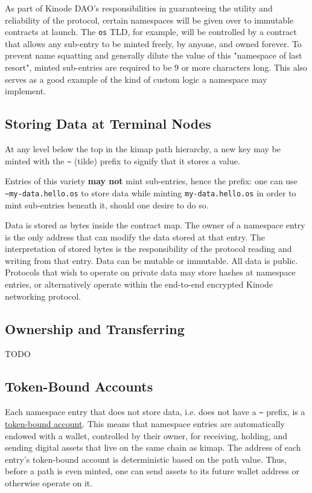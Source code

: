 \documentclass[runningheads]{llncs}
\begin{document}
As part of Kinode DAO's responsibilities in guaranteeing the utility and reliability of the protocol, certain namespaces will be given over to immutable contracts at launch.
The \verb|os| TLD, for example, will be controlled by a contract that allows any sub-entry to be minted freely, by anyone, and owned forever.
To prevent name squatting and generally dilute the value of this "namespace of last resort", minted sub-entries are required to be 9 or more characters long.
This also serves as a good example of the kind of custom logic a namespace may implement.

\subsection{Storing Data at Terminal Nodes}

At any level below the top in the kimap path hierarchy, a new key may be minted with the \verb|~| (tilde) prefix to signify that it stores a value.

Entries of this variety \textbf{may not} mint sub-entries, hence the prefix: one can use \verb|~my-data.hello.os| to store data while minting \verb|my-data.hello.os| in order to mint sub-entries beneath it, should one desire to do so.

Data is stored as bytes inside the contract map.
The owner of a namespace entry is the only address that can modify the data stored at that entry.
The interpretation of stored bytes is the responsibility of the protocol reading and writing from that entry.
Data can be mutable or immutable.
All data is public.
Protocols that wish to operate on private data may store hashes at namespace entries, or alternatively operate within the end-to-end encrypted Kinode networking protocol.

\subsection{Ownership and Transferring}

TODO

\subsection{Token-Bound Accounts}

Each namespace entry that does not store data, i.e. does not have a \verb|~| prefix, is a \href{https://eips.ethereum.org/EIPS/eip-6551}{token-bound account}.
This means that namespace entries are automatically endowed with a wallet, controlled by their owner, for receiving, holding, and sending digital assets that live on the same chain as kimap.
The address of each entry's token-bound account is deterministic based on the path value.
Thus, before a path is even minted, one can send assets to its future wallet address or otherwise operate on it.
\end{document}
